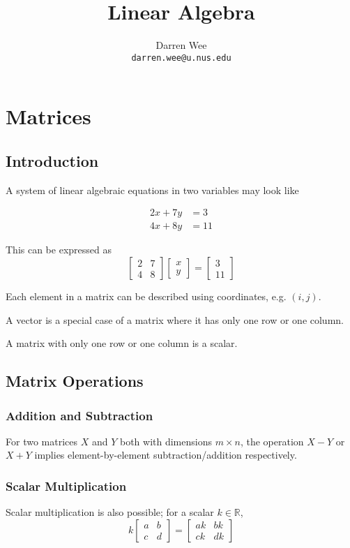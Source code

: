 \documentclass[a4paper]{article}
\title{\huge Linear Algebra}
\author{Darren Wee\\\texttt{darren.wee@u.nus.edu}}
\theoremstyle{remark}
\theoremstyle{theorem}
\begin{document}
\maketitle
\tableofcontents

\section{Matrices}
\subsection{Introduction}
A system of linear algebraic equations in two variables may look like

\begin{align}
	2x + 7y & = 3 \\
	4x + 8y & = 11
\end{align}

This can be expressed as
\begin{equation}
	\begin{bmatrix}
	2	& 7 \\
	4 	& 8
	\end{bmatrix}
	\begin{bmatrix}
	x	\\
	y
	\end{bmatrix}
	= \begin{bmatrix}
	3 \\
	11
	\end{bmatrix}
\end{equation}

Each element in a matrix can be described using coordinates, e.g. $(i,j)$.

A vector is a special case of a matrix where it has only one row or one column.

A matrix with only one row or one column is a scalar.

\subsection{Matrix Operations}
\subsubsection{Addition and Subtraction}
For two matrices $X$ and $Y$ both with dimensions $m\times n$, the operation $X-Y$ or $X+Y$ implies element-by-element subtraction/addition respectively.

\subsubsection{Scalar Multiplication}
Scalar multiplication is also possible; for a scalar $k\in\mathbb{R}$,
\begin{equation}
	k
	\begin{bmatrix}
	a	& b \\
	c	& d
	\end{bmatrix}
	=
	\begin{bmatrix}
	ak	& bk \\
	ck 	& dk
	\end{bmatrix}
\end{equation}
\end{document}

